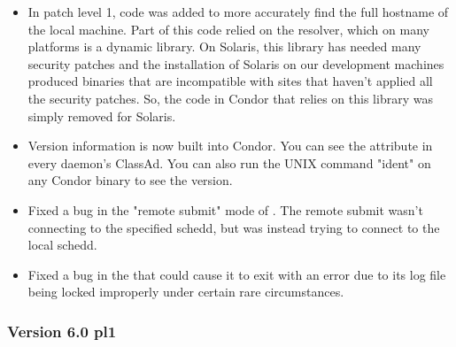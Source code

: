 \begin{itemize}

\item In patch level 1, code was added to more accurately find the
full hostname of the local machine.
Part of this code relied on the resolver, which on many platforms is a
dynamic library.
On Solaris, this library has needed many security patches and the
installation of Solaris on our development machines produced binaries
that are incompatible with sites that haven't applied all the security
patches.
So, the code in Condor that relies on this library was simply removed
for Solaris.

\item Version information is now built into Condor.
You can see the  attribute in every daemon's
ClassAd. 
You can also run the UNIX command "ident" on any Condor binary to see
the version. 

\item Fixed a bug in the "remote submit" mode of .
The remote submit wasn't connecting to the specified schedd, but was
instead trying to connect to the local schedd.

\item Fixed a bug in the  that could cause it to exit
with an error due to its log file being locked improperly under
certain rare circumstances.

\end{itemize}

\subsubsection{\label{sec:New-6-0-pl1}Version 6.0 pl1}

